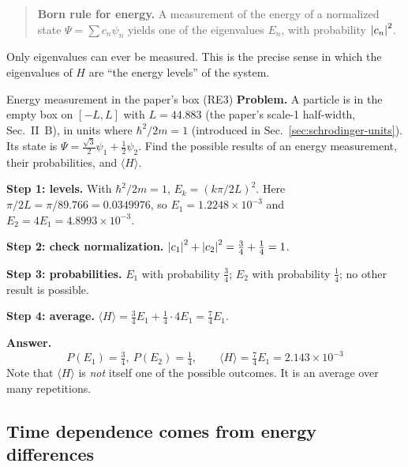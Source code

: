 \begin{quote}
\textbf{Born rule for energy.} A measurement of the energy of a normalized state $\Psi=\sum c_n\psi_n$ yields one of the eigenvalues $E_n$, with probability $\left\lvert c_n\right\rvert^2$.
\end{quote}

Only eigenvalues can ever be measured. This is the precise sense in which the eigenvalues of $H$ are ``the energy levels'' of the system.

\begin{sample}{Energy measurement in the paper's box (RE3)}
\textbf{Problem.} A particle is in the empty box on $[-L,L]$ with $L=44.883$ (the paper's scale-1 half-width, Sec.~II~B), in units where $\hbar^2/2m=1$ (introduced in Sec.~\ref{sec:schrodinger-units}). Its state is $\Psi=\frac{\sqrt3}{2}\psi_1+\frac12\psi_2$. Find the possible results of an energy measurement, their probabilities, and $\langle H\rangle$.

\textbf{Step 1: levels.} With $\hbar^2/2m=1$, $E_k=(k\pi/2L)^2$. Here $\pi/2L=\pi/89.766=0.0349976$, so $E_1=1.2248\times10^{-3}$ and $E_2=4E_1=4.8993\times10^{-3}$.

\textbf{Step 2: check normalization.} $\left\lvert c_1\right\rvert^2+\left\lvert c_2\right\rvert^2=\frac34+\frac14=1$.

\textbf{Step 3: probabilities.} $E_1$ with probability $\frac34$; $E_2$ with probability $\frac14$; no other result is possible.

\textbf{Step 4: average.} $\langle H\rangle=\frac34E_1+\frac14\cdot4E_1=\frac74E_1$.

\textbf{Answer.}
\[
\boxed{P(E_1)=\tfrac34,\ P(E_2)=\tfrac14,\qquad \langle H\rangle=\tfrac74E_1=2.143\times10^{-3}}
\]
Note that $\langle H\rangle$ is \emph{not} itself one of the possible outcomes. It is an average over many repetitions.
\end{sample}

\subsection{Time dependence comes from energy differences}

